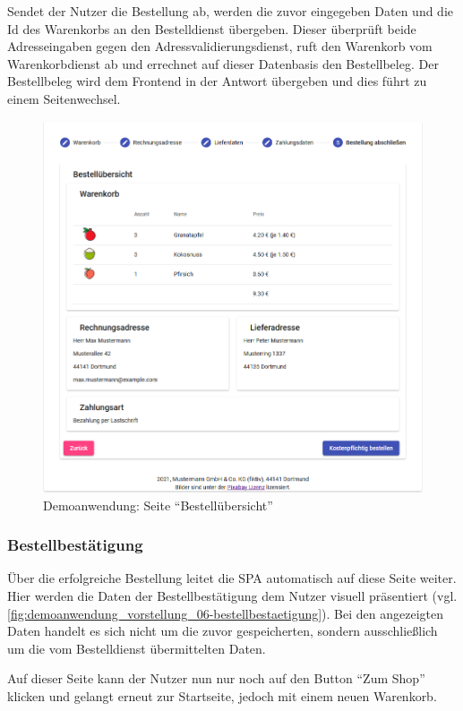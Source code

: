 Sendet der Nutzer die Bestellung ab, werden die zuvor eingegeben Daten und die Id des Warenkorbs an den Bestelldienst übergeben. Dieser überprüft beide Adresseingaben gegen den Adressvalidierungsdienst, ruft den Warenkorb vom Warenkorbdienst ab und errechnet auf dieser Datenbasis den Bestellbeleg. Der Bestellbeleg wird dem Frontend in der Antwort übergeben und dies führt zu einem Seitenwechsel.

\begin{figure}[H]
	\centering
	\includegraphics[width=0.65\linewidth]{img/04_erstellung-poc/demoanwendung_vorstellung_05-bestelluebersicht.png}
	\caption{Demoanwendung: Seite \enquote{Bestellübersicht}}
	\label{fig:demoanwendung_vorstellung_05-bestelluebersicht}
\end{figure}

\subsubsection{Bestellbestätigung}

Über die erfolgreiche Bestellung leitet die SPA automatisch auf diese Seite weiter. Hier werden die Daten der Bestellbestätigung dem Nutzer visuell präsentiert (vgl. \autoref{fig:demoanwendung_vorstellung_06-bestellbestaetigung}). Bei den angezeigten Daten handelt es sich nicht um die zuvor gespeicherten, sondern ausschließlich um die vom Bestelldienst übermittelten Daten.

Auf dieser Seite kann der Nutzer nun nur noch auf den Button \enquote{Zum Shop} klicken und gelangt erneut zur Startseite, jedoch mit einem neuen Warenkorb.

